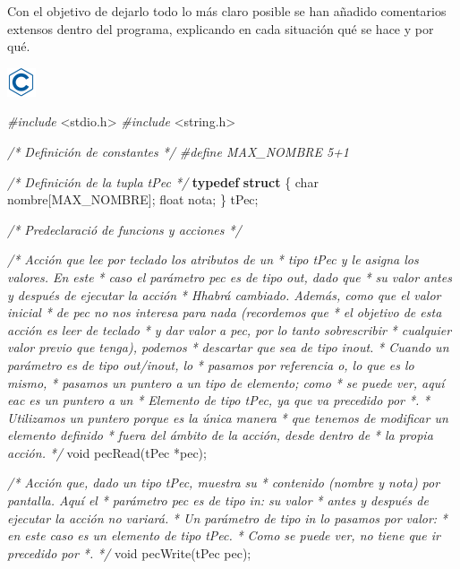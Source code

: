 \documentclass[
]{book}
\newenvironment{Shaded}{\begin{snugshade}}{\end{snugshade}}
\newcommand{\CommentTok}[1]{\textcolor[rgb]{0.56,0.35,0.01}{\textit{#1}}}
\newcommand{\DataTypeTok}[1]{\textcolor[rgb]{0.13,0.29,0.53}{#1}}
\newcommand{\ImportTok}[1]{#1}
\newcommand{\KeywordTok}[1]{\textcolor[rgb]{0.13,0.29,0.53}{\textbf{#1}}}
\newcommand{\NormalTok}[1]{#1}
\newcommand{\PreprocessorTok}[1]{\textcolor[rgb]{0.56,0.35,0.01}{\textit{#1}}}
\begin{document}
Con el objetivo de dejarlo todo lo más claro posible se han añadido comentarios extensos dentro del programa, explicando en cada situación qué se hace y por qué.

\includegraphics{./img/c.png}

\begin{Shaded}
\begin{Highlighting}[]
\PreprocessorTok{\#include }\ImportTok{\textless{}stdio.h\textgreater{}}
\PreprocessorTok{\#include }\ImportTok{\textless{}string.h\textgreater{}}

\CommentTok{/* Definición de constantes */}
\PreprocessorTok{\#define MAX\_NOMBRE 5+1}

\CommentTok{/* Definición de la tupla tPec */}
\KeywordTok{typedef} \KeywordTok{struct}\NormalTok{ \{}
    \DataTypeTok{char}\NormalTok{ nombre[MAX\_NOMBRE];}
    \DataTypeTok{float}\NormalTok{ nota;}
\NormalTok{\} tPec;}

\CommentTok{/* Predeclaració de funcions y acciones */}

\CommentTok{/* Acción que lee por teclado los atributos de un}
\CommentTok{ * tipo tPec y le asigna los valores. En este}
\CommentTok{ * caso el parámetro pec es de tipo \textquotesingle{}out\textquotesingle{}, dado que}
\CommentTok{ * su valor antes y después de ejecutar la acción}
\CommentTok{ * Hhabrá cambiado. Además, como que el valor inicial}
\CommentTok{ * de pec no nos interesa para nada (recordemos que}
\CommentTok{ * el objetivo de esta acción es leer de teclado}
\CommentTok{ * y dar valor a pec, por lo tanto sobrescribir}
\CommentTok{ * cualquier valor previo que tenga), podemos}
\CommentTok{ * descartar que sea de tipo \textquotesingle{}inout\textquotesingle{}.}
\CommentTok{ * Cuando un parámetro es de tipo out/inout, lo}
\CommentTok{ * pasamos por referencia o, lo que es lo mismo,}
\CommentTok{ * pasamos un puntero a un tipo de elemento; como}
\CommentTok{ * se puede ver, aquí eac es un puntero a un}
\CommentTok{ * Elemento de tipo tPec, ya que va precedido por *.}
\CommentTok{ * Utilizamos un puntero porque es la única manera}
\CommentTok{ * que tenemos de modificar un elemento definido}
\CommentTok{ * fuera del ámbito de la acción, desde dentro de}
\CommentTok{ * la propia acción.}
\CommentTok{ */}
\DataTypeTok{void}\NormalTok{ pecRead(tPec *pec);}

\CommentTok{/* Acción que, dado un tipo tPec, muestra su}
\CommentTok{ * contenido (nombre y nota) por pantalla. Aquí el}
\CommentTok{ * parámetro pec es de tipo in: su valor}
\CommentTok{ * antes y después de ejecutar la acción no variará.}
\CommentTok{ * Un parámetro de tipo in lo pasamos por valor:}
\CommentTok{ * en este caso es un elemento de tipo tPec.}
\CommentTok{ * Como se puede ver, no tiene que ir precedido por *.}
\CommentTok{ */}
\DataTypeTok{void}\NormalTok{ pecWrite(tPec pec);}


\end{Highlighting}
\end{Shaded}
\end{document}
